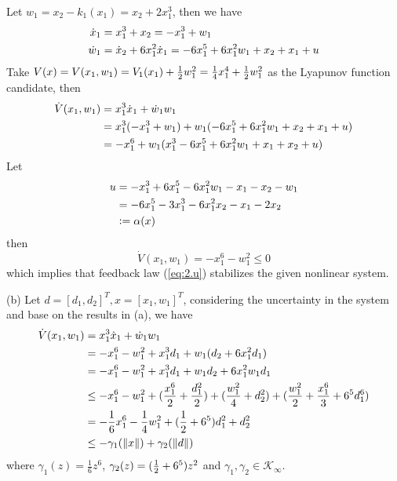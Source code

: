 \documentclass[a4 paper, 12pt]{article}
\begin{document}
Let $w_1 = x_2 - k_1(x_1) = x_2 + 2x_1^3$, then we have
\begin{align}
        \dot{x}_1 &= x_1^3+x_2 = -x_1^3 + w_1 \\
        \dot{w}_1 &= \dot{x}_2+6x_1^2\dot{x}_1 = -6x_1^5 + 6x_1^2w_1 + x_2 + x_1 + u
\end{align}
Take $V(x) = V(x_1,w_1) = V_1(x_1) + \frac{1}{2} w_1^2 = \frac{1}{4} x_1^4 + \frac{1}{2} w_1^2$ as the Lyapunov function candidate, then
\begin{equation}
        \begin{aligned}
                \dot{V}(x_1,w_1) &= x_1^3\dot{x}_1 + \dot{w}_1w_1 \\
                &= x_1^3(-x_1^3+w_1) + w_1(-6x_1^5 + 6x_1^2w_1 + x_2 + x_1 + u) \\
                &= -x_1^6 + w_1(x_1^3 - 6x_1^5 + 6x_1^2w_1 + x_1 + x_2 + u)
        \end{aligned}
\end{equation}
Let 
\begin{equation} \label{eq:2.u}
        \begin{aligned}
                u &= -x_1^3 + 6x_1^5 - 6x_1^2w_1 - x_1 - x_2 - w_1 \\
                &= -6x_1^5 - 3x_1^3 - 6x_1^2x_2 - x_1 -2x_2 \\
                &\mathrel{\mathop:}= \alpha(x)
        \end{aligned}
\end{equation}
then
\begin{equation}
        \dot{V}(x_1,w_1) = -x_1^6 - w_1^2 \leq 0
\end{equation}
which implies that feedback law (\ref{eq:2.u}) stabilizes the given nonlinear system.

(b) Let $d = [d_1,d_2]^T, x = [x_1, w_1]^T$, considering the uncertainty in the system and base on the results in (a), we have
\begin{equation}
        \begin{aligned}
                \dot{V}(x_1,w_1) &= x_1^3\dot{x}_1 + \dot{w}_1w_1 \\
                &= -x_1^6 - w_1^2 + x_1^3d_1 + w_1(d_2 + 6x_1^2d_1) \\
                &= -x_1^6 - w_1^2 + x_1^3d_1 + w_1d_2 + 6x_1^2w_1d_1 \\
                &\leq -x_1^6 - w_1^2 + (\frac{x_1^6}{2} + \frac{d_1^2}{2}) + (\frac{w_1^2}{4} + d_2^2) + (\frac{w_1^2}{2} + \frac{x_1^6}{3} + 6^5d_1^6) \\
                &= -\frac{1}{6}x_1^6 - \frac{1}{4}w_1^2 + (\frac{1}{2}+6^5)d_1^2 + d_2^2 \\
                &\leq -\gamma_1(\left\|x\right\|) + \gamma_2(\left\|d\right\|)
        \end{aligned}
\end{equation}
where $\gamma_1(z) = \frac{1}{6}z^6$, $\gamma_2(z) = (\frac{1}{2}+6^5)z^2 $
and $\gamma_1, \gamma_2 \in \mathcal{K}_\infty $. 
\end{document}
